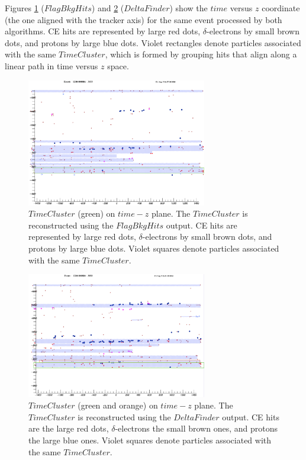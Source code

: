 Figures \ref{fig:TZCluster1} ($FlagBkgHits$) and 
\ref{fig:TZCluster2} ($DeltaFinder$) show the 
$time$ versus $z$ coordinate 
(the one aligned with the tracker axis) for 
the same event processed by both algorithms. 
CE hits are represented by large red dots, 
$\delta$-electrons 
by small brown dots, and protons by large 
blue dots. Violet rectangles denote particles associated with 
the same $TimeCluster$, 
which is formed by grouping hits that 
align along a linear 
path in time versus $z$ space.
\begin{figure}[!h]
    \centering
    \includegraphics[width =0.7\textwidth]{figures/png/Screenshot_20240819_153229.png}
    \caption[$TimeCluster$ on $time-z$ plane.]{$TimeCluster$ (green) on $time-z$ plane. 
    The $TimeCluster$ is reconstructed using the $FlagBkgHits$ output.
    CE hits are represented by large red dots, $\delta$-electrons 
    by small brown dots, and protons by large blue dots. Violet 
    squares denote particles associated with the same $TimeCluster$.}
    \label{fig:TZCluster1}
\end{figure}
\begin{figure}[!h]
    \centering
    \includegraphics[width =0.7\textwidth]{figures/png/Screenshot_20240819_153730.png}
    \caption[$TimeCluster$ on $time-z$ plane.]{$TimeCluster$ (green and orange) on $time-z$ 
    plane. The $TimeCluster$ is reconstructed using the $DeltaFinder$ output.
    CE hits are the large red dots, $\delta$-electrons 
    the small brown ones, and protons the large blue ones. Violet 
    squares denote particles associated with the same $TimeCluster$.}
    \label{fig:TZCluster2}
\end{figure}
